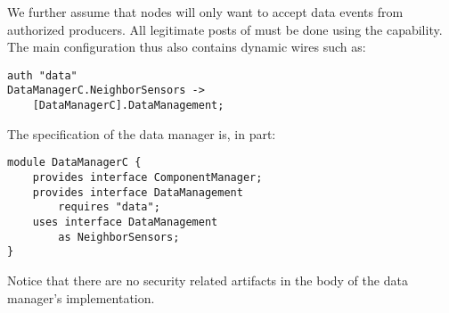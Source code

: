 We further assume that nodes will only want to accept data events from authorized producers. All
legitimate posts of  must be done using the  capability. The main
configuration thus also contains dynamic wires such as:
\begin{Verbatim}
auth "data"
DataManagerC.NeighborSensors ->
    [DataManagerC].DataManagement;
\end{Verbatim}
\vspace{0.3em}
The specification of the data manager is, in part:
\begin{Verbatim}
module DataManagerC {
    provides interface ComponentManager;
    provides interface DataManagement
        requires "data";
    uses interface DataManagement
        as NeighborSensors;
}
\end{Verbatim}
Notice that there are no security related artifacts in the body of the data manager's
implementation.

